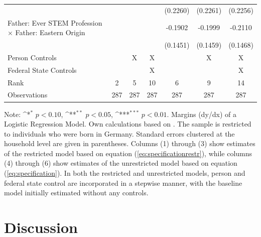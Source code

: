 \documentclass[a4paper, oneside, hyperfootnotes = false]{article}
\def\sym#1{\ifmmode^{#1}\else\(^{#1}\)\fi}
\begin{document}
{\begin{landscape}
\begin{table}[ht]
\begin{center}
{\begin{tabular}{l*{6}{c}}
					&                     &                     &                     &    (0.2260)         &    (0.2261)         &    (0.2256)         \\
					\addlinespace
					Father: Ever STEM Profession $\times$ Father: Eastern Origin&                     &                     &                     &     -0.1902         &     -0.1999         &     -0.2110         \\
					&                     &                     &                     &    (0.1451)         &    (0.1459)         &    (0.1468)         \\
					\midrule
					Person Controls & & X  & X & & X & X \\
					Federal State Controls & & & X & & & X \\
					Rank                &      2         &      5         &     10         &      6         &      9         &     14         \\
					Observations &    287         &    287         &    287         &    287         &    287         &    287         \\
					\bottomrule
			\end{tabular}}
			
			\vspace{2mm}
			
			\parbox{15cm}{
				\linespread{1}\footnotesize Note: \sym{*} \(p<0.10\), \sym{**} \(p<0.05\), \sym{***} \(p<0.01\). Margins (dy/dx) of a Logistic Regression Model. Own calculations based on \cite{SOEP2023}. The sample is restricted to individuals who were born in Germany. Standard errors clustered at the household level are given in parentheses. Columns (1) through (3) show estimates of the restricted model based on equation (\ref{eq:specificationrestr}), while columns (4) through (6) show estimates of the unrestricted model based on equation (\ref{eq:specification}). In both the restricted and unrestricted models, person and federal state control are incorporated in a stepwise manner, with the baseline model initially estimated without any controls.}
			
		\end{center}
	\end{table}
\end{landscape}

\section{Discussion}
\label{discussion}

}
\end{document}
